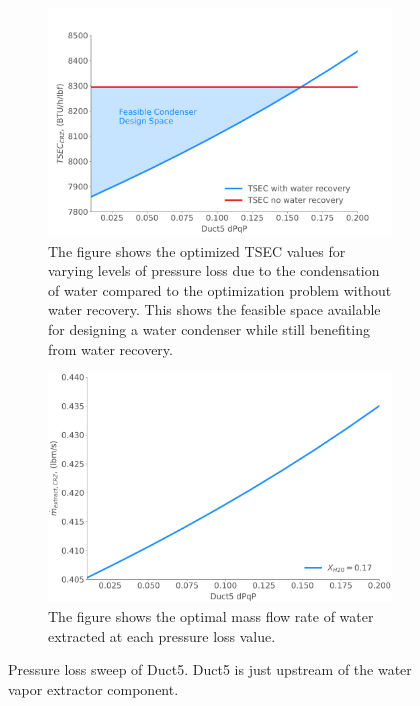 \documentclass[conf]{new-aiaa}
\begin{document}
\begin{figure}[hbt!]
  \centering
  \begin{subfigure}[t]{0.48\textwidth}
    \includegraphics[width=\textwidth]{N3_dpqp.pdf}
    \caption{
      The figure shows the optimized TSEC values for varying levels of pressure loss due to the condensation of water compared to the optimization problem without water recovery.
      This shows the feasible space available for designing a water condenser while still benefiting from water recovery.}
    \label{fig:dpqp_sweep}
  \end{subfigure}
  \hspace{2pt}
  \begin{subfigure}[t]{0.48\textwidth}
    \includegraphics[width=\textwidth]{N3_wdot.pdf}
    \caption{
      The figure shows the optimal mass flow rate of water extracted at each pressure loss value.
    }
    \label{fig:dpqp_wdot}
  \end{subfigure}
  \caption{Pressure loss sweep of Duct5.
    Duct5 is just upstream of the water vapor extractor component.}
  \label{fig:dpqp_study}
\end{figure}
\end{document}
